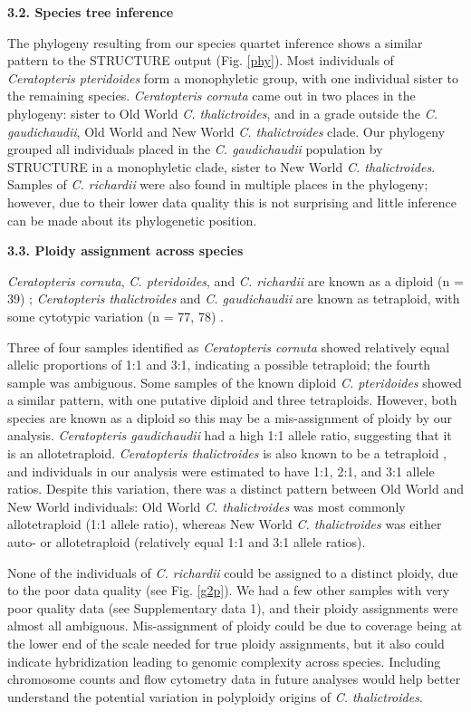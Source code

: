 \documentclass[12pt]{article}
\begin{document}
\begin{flushleft}
\textbf{3.2. Species tree inference}

 The phylogeny resulting from our species quartet inference shows a similar pattern to the {\small{STRUCTURE}} output (Fig. \ref{phy}). Most individuals of \textit{Ceratopteris pteridoides} form a monophyletic group, with one individual sister to the remaining species. \textit{Ceratopteris cornuta} came out in two places in the phylogeny: sister to Old World \textit{C. thalictroides}, and in a grade outside the \textit{C. gaudichaudii}, Old World and New World \textit{C. thalictroides} clade. Our phylogeny grouped all individuals placed in the \textit{C. gaudichaudii} population by {\small{STRUCTURE}} in a monophyletic clade, sister to New World \textit{C. thalictroides}. Samples of \textit{C. richardii} were also found in multiple places in the phylogeny; however, due to their lower data quality this is not surprising and little inference can be made about its phylogenetic position.

\textbf{3.3. Ploidy assignment across species}

\textit{Ceratopteris cornuta}, \textit{C. pteridoides}, and \textit{C. richardii} are known as a diploid (n = 39) \autocite{Adjie2007, Hickok1977}; \textit{Ceratopteris thalictroides} and \textit{C. gaudichaudii} are known as tetraploid, with some cytotypic variation (n = 77, 78) \autocite{Adjie2007, Masuyama2010}. 

Three of four samples identified as \textit{Ceratopteris cornuta} showed relatively equal allelic proportions of 1:1 and 3:1, indicating a possible tetraploid; the fourth sample was ambiguous. Some samples of the known diploid \textit{C. pteridoides} showed a similar pattern, with one putative diploid and three tetraploids. However, both species are known as a diploid so this may be a mis-assignment of ploidy by our analysis. \textit{Ceratopteris gaudichaudii} had a high 1:1 allele ratio, suggesting that it is an allotetraploid. \textit{Ceratopteris thalictroides} is also known to be a tetraploid \autocite{LloydTax1974, Masuyama2010}, and individuals in our analysis were estimated to have 1:1, 2:1, and 3:1 allele ratios. Despite this variation, there was a distinct pattern between Old World and New World individuals: Old World \textit{C. thalictroides} was most commonly allotetraploid (1:1 allele ratio), whereas New World \textit{C. thalictroides} was either auto- or allotetraploid (relatively equal 1:1 and 3:1 allele ratios). 

None of the individuals of \textit{C. richardii} could be assigned to a distinct ploidy, due to the poor data quality (see Fig. \ref{g2p}). We had a few other samples with very poor quality data (see Supplementary data 1), and their ploidy assignments were almost all ambiguous. Mis-assignment of ploidy could be due to coverage being at the lower end of the scale needed for true ploidy assignments, but it also could indicate hybridization leading to genomic complexity across species. Including chromosome counts and flow cytometry data in future analyses would help better understand the potential variation in polyploidy origins of \textit{C. thalictroides}.


\end{flushleft}
\end{document}
